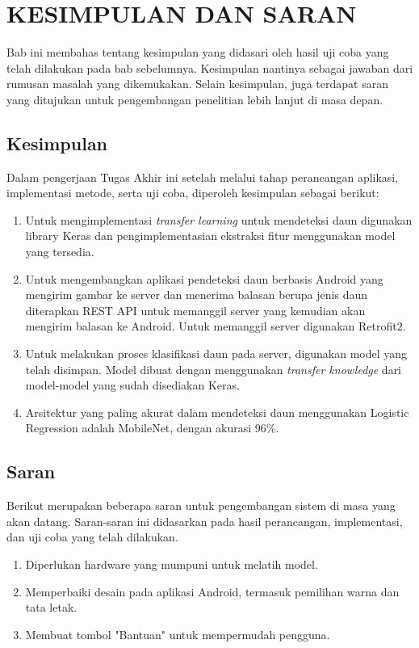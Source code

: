\chapter{KESIMPULAN DAN SARAN}
Bab ini membahas tentang kesimpulan yang didasari oleh hasil uji coba yang telah dilakukan pada bab sebelumnya. Kesimpulan nantinya sebagai jawaban dari rumusan masalah yang dikemukakan. Selain kesimpulan, juga terdapat saran yang ditujukan untuk pengembangan penelitian lebih lanjut di masa depan.

\section{Kesimpulan}
Dalam pengerjaan Tugas Akhir ini setelah melalui tahap perancangan aplikasi, implementasi metode, serta uji coba, diperoleh kesimpulan sebagai berikut:

\begin{enumerate}
	\item Untuk mengimplementasi \textit{transfer learning} untuk mendeteksi daun digunakan library Keras dan pengimplementasian ekstraksi fitur menggunakan model yang tersedia.
	\item Untuk mengembangkan aplikasi pendeteksi daun berbasis Android yang mengirim gambar ke server dan menerima balasan berupa jenis daun diterapkan REST API untuk memanggil server yang kemudian akan mengirim balasan ke Android. Untuk memanggil server digunakan Retrofit2.
	\item Untuk melakukan proses klasifikasi daun pada server, digunakan model yang telah disimpan. Model dibuat dengan menggunakan \textit{transfer knowledge} dari model-model yang sudah disediakan Keras.
	\item Arsitektur yang paling akurat dalam mendeteksi daun menggunakan Logistic Regression adalah MobileNet, dengan akurasi 96\%.
\end{enumerate}

\section{Saran}
Berikut merupakan beberapa saran untuk pengembangan sistem di masa yang akan datang. Saran-saran ini didasarkan pada hasil perancangan, implementasi, dan uji coba yang telah dilakukan.
\begin{enumerate}
	\item Diperlukan hardware yang mumpuni untuk melatih model.
	\item Memperbaiki desain pada aplikasi Android, termasuk pemilihan warna dan tata letak.
	\item Membuat tombol "Bantuan" untuk mempermudah pengguna.
\end{enumerate}